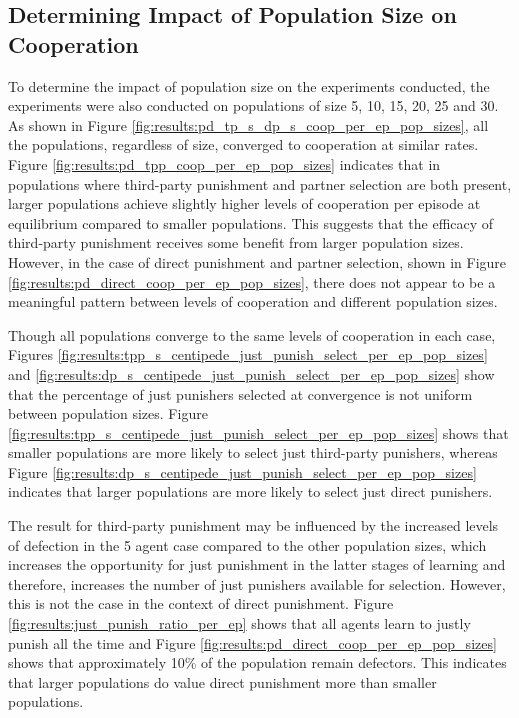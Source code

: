 \documentclass[sn-aps,numbered]{sn-jnl}%
\theoremstyle{thmstyleone}%
\theoremstyle{thmstyletwo}%
\theoremstyle{thmstylethree}%
\begin{document}
\begin{appendices}
\clearpage
\section{Determining Impact of Population Size on Cooperation \label{appendix:pop_size}}

To determine the impact of population size on the experiments conducted, the experiments were also conducted on populations of size 5, 10, 15, 20, 25 and 30. As shown in Figure \ref{fig:results:pd_tp_s_dp_s_coop_per_ep_pop_sizes}, all the populations, regardless of size, converged to cooperation at similar rates. Figure \ref{fig:results:pd_tpp_coop_per_ep_pop_sizes} indicates that in populations where third-party punishment and partner selection are both present, larger populations achieve slightly higher levels of cooperation per episode at equilibrium compared to smaller populations. This suggests that the efficacy of third-party punishment receives some benefit from larger population sizes. However, in the case of direct punishment and partner selection, shown in Figure \ref{fig:results:pd_direct_coop_per_ep_pop_sizes}, there does not appear to be a meaningful pattern between levels of cooperation and different population sizes. 

Though all populations converge to the same levels of cooperation in each case, Figures \ref{fig:results:tpp_s_centipede_just_punish_select_per_ep_pop_sizes} and \ref{fig:results:dp_s_centipede_just_punish_select_per_ep_pop_sizes} show that the percentage of just punishers selected at convergence is not uniform between population sizes. Figure \ref{fig:results:tpp_s_centipede_just_punish_select_per_ep_pop_sizes} shows that smaller populations are more likely to select just third-party punishers, whereas Figure \ref{fig:results:dp_s_centipede_just_punish_select_per_ep_pop_sizes} indicates that larger populations are more likely to select just direct punishers.

The result for third-party punishment may be influenced by the increased levels of defection in the 5 agent case compared to the other population sizes, which increases the opportunity for just punishment in the latter stages of learning and therefore, increases the number of just punishers available for selection. However, this is not the case in the context of direct punishment. Figure \ref{fig:results:just_punish_ratio_per_ep} shows that all agents learn to justly punish all the time and Figure \ref{fig:results:pd_direct_coop_per_ep_pop_sizes} shows that approximately 10\% of the population remain defectors. This indicates that larger populations do value direct punishment more than smaller populations. 


\end{appendices}
\end{document}
